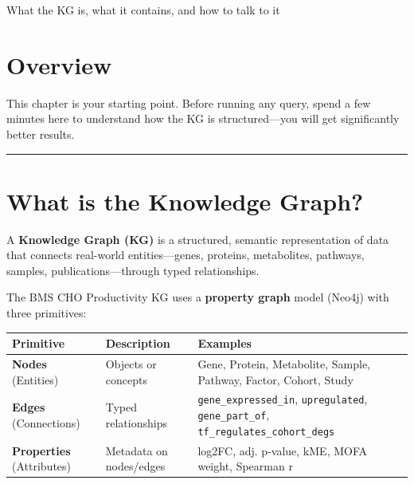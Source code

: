 \documentclass[
  letterpaper,
  oneside,
  open=any]{scrbook}
\newcounter{none} %
\begin{document}
What the KG is, what it contains, and how to talk to it

\hfill\break

\section{Overview}\label{sec-orientation}

This chapter is your starting point. Before running any query, spend a
few minutes here to understand how the KG is structured---you will get
significantly better results.

\begin{center}\rule{0.5\linewidth}{0.5pt}\end{center}

\section{What is the Knowledge Graph?}\label{sec-kg-intro}

A \textbf{Knowledge Graph (KG)} is a structured, semantic representation
of data that connects real-world entities---genes, proteins,
metabolites, pathways, samples, publications---through typed
relationships.

The BMS CHO Productivity KG uses a \textbf{property graph} model (Neo4j)
with three primitives:

{\def\LTcaptype{none} %
\begin{longtable}[]{@{}
  >{\raggedright\arraybackslash}p{}
  >{\raggedright\arraybackslash}p{}
  >{\raggedright\arraybackslash}p{}@{}}
\toprule\noalign{}
\begin{minipage}[b]{\linewidth}\raggedright
Primitive
\end{minipage} & \begin{minipage}[b]{\linewidth}\raggedright
Description
\end{minipage} & \begin{minipage}[b]{\linewidth}\raggedright
Examples
\end{minipage} \\
\midrule\noalign{}
\endhead
\bottomrule\noalign{}
\endlastfoot
\textbf{Nodes} (Entities) & Objects or concepts & Gene, Protein,
Metabolite, Sample, Pathway, Factor, Cohort, Study \\
\textbf{Edges} (Connections) & Typed relationships &
\texttt{gene\_expressed\_in}, \texttt{upregulated},
\texttt{gene\_part\_of}, \texttt{tf\_regulates\_cohort\_degs} \\
\textbf{Properties} (Attributes) & Metadata on nodes/edges & log2FC,
adj. p-value, kME, MOFA weight, Spearman r \\
\end{longtable}
}
\end{document}
